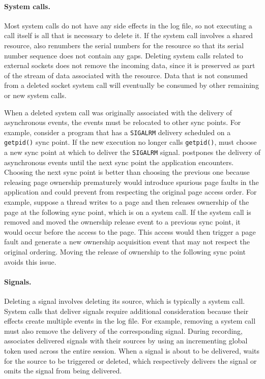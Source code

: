 \paragraph{System calls.}
Most system calls do not have any side
effects in the log file, so not executing a call itself is all that is
necessary to delete it. If the system call involves a shared resource, {\dora}
also renumbers the serial numbers for the resource so that its serial
number sequence does not contain any gaps. Deleting system
calls related to external sockets does not remove the incoming data, since it is
preserved as part of the stream of data associated with the resource.
Data that is not consumed from a deleted socket system call
will eventually be consumed by other remaining or new system calls.

When a deleted system call was originally associated with the
delivery of asynchronous events, the events must be relocated to other
sync points.  For example, consider a program that has a {\tt SIGALRM}
delivery scheduled on a {\tt getpid()} sync point.  If the new
execution no longer calls {\tt getpid()}, {\dora} must choose a new
sync point at which to deliver the {\tt SIGALRM} signal.  {\dora}
postpones the delivery of asynchronous events until the next sync
point the application encounters.
Choosing the next sync point is better than choosing the
previous one because releasing page ownership prematurely would
introduce spurious page faults in the application and could prevent
{\dora} from respecting the original page access order.  For
example, suppose a thread writes to a page and then releases ownership
of the page at the following sync point, which is on a system call. If
the system call is removed and {\dora} moved the ownership release
event to a previous sync point, it would occur before the access to
the page. This access would then trigger a page fault and generate a
new ownership acquisition event that may not respect the
original ordering.  Moving the release of ownership to the following
sync point avoids this issue.

\paragraph{Signals.}
Deleting a signal involves deleting its source, which is typically a
system call. System calls that deliver signals require additional
consideration because their effects create multiple events in the log
file.  For example, removing a  system call must also
remove the delivery of the corresponding signal.  During recording,
{\dora} associates delivered signals with their sources by using an
incrementing global token used across the entire session.
When a signal is about to be delivered, {\dora} waits for the
source to be triggered or deleted, which respectively delivers the
signal or omits the signal from being delivered. 

